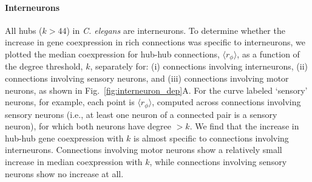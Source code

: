 \documentclass[10pt,letterpaper]{article}
\begin{document}
\paragraph{Interneurons}
All hubs ($k > 44$) in \emph{C. elegans} are interneurons. %
To determine whether the increase in gene coexpression in rich connections was specific to interneurons, we plotted the median coexpression for hub-hub connections, $\langle r_\phi \rangle$, as a function of the degree threshold, $k$, separately for:
(i) connections involving interneurons,
(ii) connections involving sensory neurons, and
(iii) connections involving motor neurons, as shown in Fig.~\ref{fig:interneuron_dep}A.
For the curve labeled `sensory' neurons, for example, each point is $\langle r_\phi \rangle$, computed across connections involving sensory neurons (i.e., at least one neuron of a connected pair is a sensory neuron), for which both neurons have degree $>k$.
We find that the increase in hub-hub gene coexpression with $k$ is almost specific to connections involving interneurons.
Connections involving motor neurons show a relatively small increase in median coexpression with $k$, while connections involving sensory neurons show no increase at all.
\end{document}
